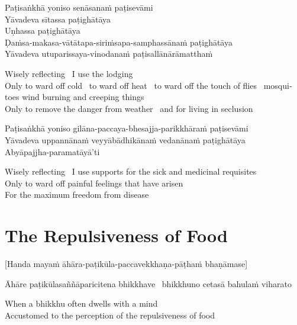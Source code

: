Paṭisaṅkhā yoniso senāsanaṁ paṭisevāmi\\
Yāvadeva sītassa paṭighātāya\\
Uṇhassa paṭighātāya\\
Ḍaṁsa-makasa-vātātapa-siriṁsapa-samphassānaṁ paṭighātāya\\
Yāvadeva utuparissaya-vinodanaṁ paṭisallānārāmatthaṁ

\begin{english}
  Wisely reflecting \breathmark\ I use the lodging\\
  Only to ward off cold \breathmark\ to ward off heat \breathmark\ to ward off the touch of flies \breathmark\ mosquitoes wind burning and creeping things\\
  Only to remove the danger from weather \breathmark\ and for living in seclusion
\end{english}

Paṭisaṅkhā yoniso gilāna-paccaya-bhesajja-parikkhāraṁ paṭisevāmi\\
Yāvadeva uppannānaṁ veyyābādhikānaṁ vedanānaṁ paṭighātāya\\
Abyāpajjha-paramatāyā’ti

\begin{english}
  Wisely reflecting \breathmark\ I use supports for the sick and medicinal requisites\\
  Only to ward off painful feelings that have arisen\\
  For the maximum freedom from disease
\end{english}

\suttaRef{[MN 2]}

\clearpage

\section{The Repulsiveness of Food}
\label{repulsiveness-of-food}

\begin{center}
  [Handa mayaṁ āhāra-paṭikūla-paccavekkhaṇa-pāṭhaṁ bhaṇāmase]
\end{center}

Āhāre paṭikūlasaññāparicitena bhikkhave \breathmark\ bhikkhuno cetasā bahulaṁ viharato

\begin{english}
  When a bhikkhu often dwells with a mind\\
  Accustomed to the perception of the repulsiveness of food
\end{english}


